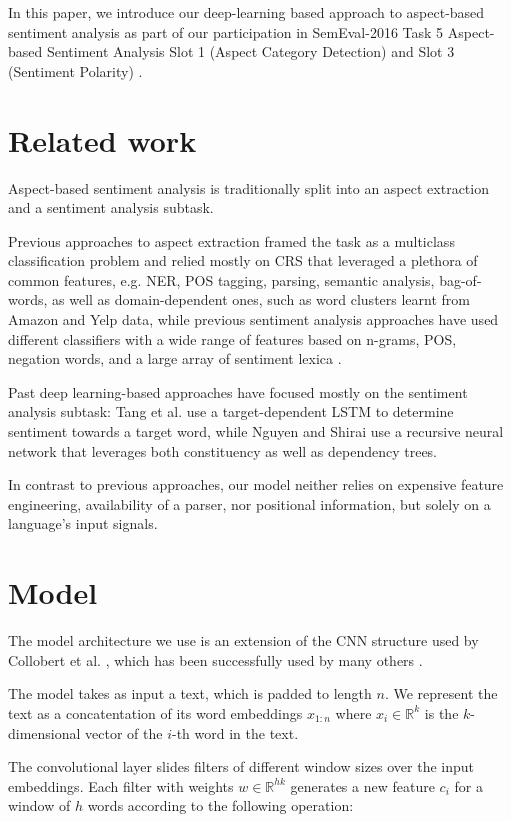 \documentclass[11pt,letterpaper]{article}
\begin{document}
In this paper, we introduce our deep-learning based approach to aspect-based sentiment analysis as part of our participation in SemEval-2016 Task 5 Aspect-based Sentiment Analysis Slot 1 (Aspect Category Detection) and Slot 3 (Sentiment Polarity) .

\section{Related work}

Aspect-based sentiment analysis is traditionally split into an aspect extraction and a sentiment analysis subtask.

Previous approaches to aspect extraction framed the task as a multiclass classification problem and relied mostly on CRS that leveraged a plethora of common features, e.g. NER, POS tagging, parsing, semantic analysis, bag-of-words, as well as domain-dependent ones, such as word clusters learnt from Amazon and Yelp data, while previous sentiment analysis approaches have used different classifiers with a wide range of features based on n-grams, POS, negation words, and a large array of sentiment lexica \cite{Pontiki2014a,Pontiki2015}.

Past deep learning-based approaches have focused mostly on the sentiment analysis subtask: Tang et al.  use a target-dependent LSTM to determine sentiment towards a target word, while Nguyen and Shirai  use a recursive neural network that leverages both constituency as well as dependency trees.

In contrast to previous approaches, our model neither relies on expensive feature engineering, availability of a parser, nor positional information, but solely on a language's input signals.

\section{Model} \label{sec:model}

The model architecture we use is an extension of the CNN structure used by Collobert et al. , which has been successfully used by many others \cite{Kim2014}.

The model takes as input a text, which is padded to length $n$. We represent the text as a concatentation of its word embeddings $x_{1:n}$ where $x_i \in \mathbb{R}^k$ is the $k$-dimensional vector of the $i$-th word in the text.

The convolutional layer slides filters of different window sizes over the input embeddings. Each filter with weights $w \in \mathbb{R}^{hk}$ generates a new feature $c_i$ for a window of $h$ words according to the following operation:
\end{document}
